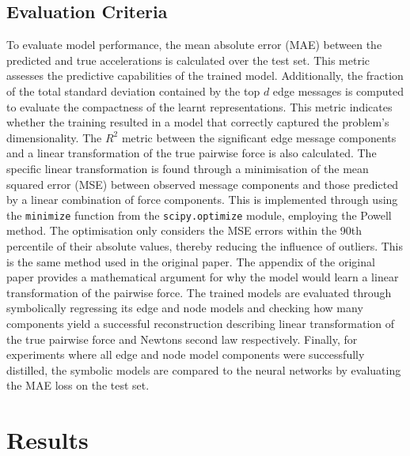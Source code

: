 \documentclass[11pt]{article}
\begin{document}
\subsection{Evaluation Criteria}
To evaluate model performance, the mean absolute error (MAE) between the predicted and true accelerations is calculated over the test set. This metric assesses the predictive capabilities of the trained model. Additionally, the fraction of the total standard deviation contained by the top $d$ edge messages is computed to evaluate the compactness of the learnt representations. This metric indicates whether the training resulted in a model that correctly captured the problem's dimensionality. The $R^2$ metric between the significant edge message components and a linear transformation of the true pairwise force is also calculated. The specific linear transformation is found through a minimisation of the mean squared error (MSE) between observed message components and those predicted by a linear combination of force components. This is implemented through using the \texttt{minimize} function from the \texttt{scipy.optimize} module, employing the Powell method. The optimisation only considers the MSE errors within the 90th percentile of their absolute values, thereby reducing the influence of outliers. This is the same method used in the original paper. The appendix of the original paper provides a mathematical argument for why the model would learn a linear transformation of the pairwise force. The trained models are evaluated through symbolically regressing its edge and node models and checking how many components yield a successful reconstruction describing linear transformation of the true pairwise force and Newtons second law respectively. Finally, for experiments where all edge and node model components were successfully distilled, the symbolic models are compared to the neural networks by evaluating the MAE loss on the test set.

\section{Results}
\end{document}
